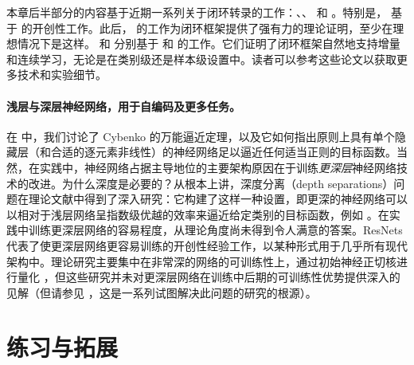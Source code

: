 \documentclass[../../book-main_zh.tex]{subfiles}
\begin{document}
本章后半部分的内容基于近期一系列关于闭环转录的工作：\cite{Dai-entropy-2022}、\cite{pai2022pursuit}、\cite{tong2023incremental} 和 \cite{pmlr-v234-tong24a}。特别是， 基于 \cite{Dai-entropy-2022} 的开创性工作。此后，\cite{pai2022pursuit} 的工作为闭环框架提供了强有力的理论证明，至少在理想情况下是这样。 和  分别基于 \cite{tong2023incremental} 和 \cite{pmlr-v234-tong24a} 的工作。它们证明了闭环框架自然地支持增量和连续学习，无论是在类别级还是样本级设置中。读者可以参考这些论文以获取更多技术和实验细节。

\paragraph{浅层与深层神经网络，用于自编码及更多任务。}
在  中，我们讨论了 Cybenko 的万能逼近定理，以及它如何指出原则上具有单个隐藏层（和合适的逐元素非线性）的神经网络足以逼近任何适当正则的目标函数。当然，在实践中，神经网络占据主导地位的主要架构原因在于训练\textit{更深层}神经网络技术的改进。为什么深度是必要的？从根本上讲，深度分离（depth separations）问题在理论文献中得到了深入研究：它构建了这样一种设置，即更深的神经网络可以以相对于浅层网络呈指数级优越的效率来逼近给定类别的目标函数，例如 \cite{Telgarsky2016-sn,Bresler2020-xy,Venturi2021-qc}。在实践中训练更深层网络的容易程度，从理论角度尚未得到令人满意的答案。ResNets \cite{he2016deep} 代表了使更深层网络更容易训练的开创性经验工作，以某种形式用于几乎所有现代架构中。理论研究主要集中在非常深的网络的可训练性上，通过初始神经正切核进行量化 \cite{Buchanan2021-sj,Martens2021-cx}，但这些研究并未对更深层网络在训练中后期的可训练性优势提供深入的见解（但请参见 \cite{Yang2021-gw}，这是一系列试图解决此问题的研究的根源）。

\section{练习与拓展}
\end{document}
